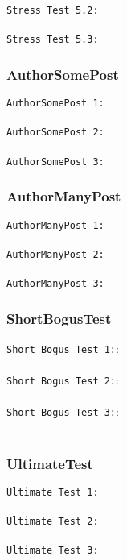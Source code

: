 \begin{description}
\texttt{Stress Test 5.2:}\\
\\

\texttt{Stress Test 5.3:}\\


\subsubsection{AuthorSomePost}
\texttt{AuthorSomePost 1:}\\
\\

\texttt{AuthorSomePost 2:}\\
\\

\texttt{AuthorSomePost 3:}\\


\subsubsection{AuthorManyPost}
\texttt{AuthorManyPost 1:}\\
\\

\texttt{AuthorManyPost 2:}\\
\\

\texttt{AuthorManyPost 3:}\\


\subsubsection{ShortBogusTest}
\texttt{Short Bogus Test 1:}:\\
\\

\texttt{Short Bogus Test 2:}:\\
\\

\texttt{Short Bogus Test 3:}:\\
\\

\subsubsection{UltimateTest}
\texttt{Ultimate Test 1:}\\
\\

\texttt{Ultimate Test 2:}\\
\\

\texttt{Ultimate Test 3:}\\
\\

\end{description}

